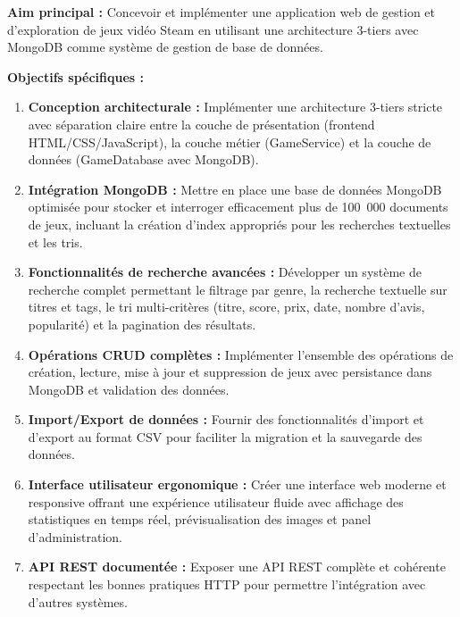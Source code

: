 \textbf{Aim principal :} Concevoir et implémenter une application web de gestion et d'exploration de jeux vidéo Steam en utilisant une architecture 3-tiers avec MongoDB comme système de gestion de base de données.

\textbf{Objectifs spécifiques :}

\begin{enumerate}
    \item \textbf{Conception architecturale :} Implémenter une architecture 3-tiers stricte avec séparation claire entre la couche de présentation (frontend HTML/CSS/JavaScript), la couche métier (GameService) et la couche de données (GameDatabase avec MongoDB).
    
    \item \textbf{Intégration MongoDB :} Mettre en place une base de données MongoDB optimisée pour stocker et interroger efficacement plus de 100~000 documents de jeux, incluant la création d'index appropriés pour les recherches textuelles et les tris.
    
    \item \textbf{Fonctionnalités de recherche avancées :} Développer un système de recherche complet permettant le filtrage par genre, la recherche textuelle sur titres et tags, le tri multi-critères (titre, score, prix, date, nombre d'avis, popularité) et la pagination des résultats.
    
    \item \textbf{Opérations CRUD complètes :} Implémenter l'ensemble des opérations de création, lecture, mise à jour et suppression de jeux avec persistance dans MongoDB et validation des données.
    
    \item \textbf{Import/Export de données :} Fournir des fonctionnalités d'import et d'export au format CSV pour faciliter la migration et la sauvegarde des données.
    
    \item \textbf{Interface utilisateur ergonomique :} Créer une interface web moderne et responsive offrant une expérience utilisateur fluide avec affichage des statistiques en temps réel, prévisualisation des images et panel d'administration.
    
    \item \textbf{API REST documentée :} Exposer une API REST complète et cohérente respectant les bonnes pratiques HTTP pour permettre l'intégration avec d'autres systèmes.
\end{enumerate}



